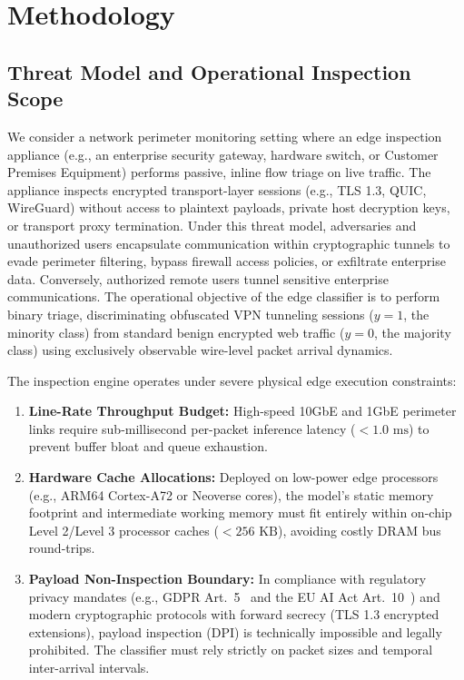 \documentclass[conference]{IEEEtran}
\begin{document}
\section{Methodology}
\label{sec:methodology}

\subsection{Threat Model and Operational Inspection Scope}
\label{sec:threat_model}
We consider a network perimeter monitoring setting where an edge inspection appliance (e.g., an enterprise security gateway, hardware switch, or Customer Premises Equipment) performs passive, inline flow triage on live traffic. The appliance inspects encrypted transport-layer sessions (e.g., TLS 1.3, QUIC, WireGuard) without access to plaintext payloads, private host decryption keys, or transport proxy termination. Under this threat model, adversaries and unauthorized users encapsulate communication within cryptographic tunnels to evade perimeter filtering, bypass firewall access policies, or exfiltrate enterprise data. Conversely, authorized remote users tunnel sensitive enterprise communications. The operational objective of the edge classifier is to perform binary triage, discriminating obfuscated VPN tunneling sessions ($y=1$, the minority class) from standard benign encrypted web traffic ($y=0$, the majority class) using exclusively observable wire-level packet arrival dynamics.

The inspection engine operates under severe physical edge execution constraints:
\begin{enumerate}
    \item \textbf{Line-Rate Throughput Budget:} High-speed 10GbE and 1GbE perimeter links require sub-millisecond per-packet inference latency ($< 1.0\text{ ms}$) to prevent buffer bloat and queue exhaustion.
    \item \textbf{Hardware Cache Allocations:} Deployed on low-power edge processors (e.g., ARM64 Cortex-A72 or Neoverse cores), the model's static memory footprint and intermediate working memory must fit entirely within on-chip Level 2/Level 3 processor caches ($< 256\text{ KB}$), avoiding costly DRAM bus round-trips.
    \item \textbf{Payload Non-Inspection Boundary:} In compliance with regulatory privacy mandates (e.g., GDPR Art.~5~\cite{b7} and the EU AI Act Art.~10~\cite{b8}) and modern cryptographic protocols with forward secrecy (TLS 1.3 encrypted extensions), payload inspection (DPI) is technically impossible and legally prohibited. The classifier must rely strictly on packet sizes and temporal inter-arrival intervals.
\end{enumerate}
\end{document}
